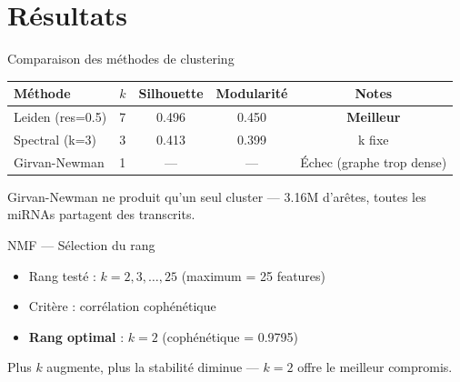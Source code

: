 \section{Résultats}

\begin{frame}{Comparaison des méthodes de clustering}
\begin{table}
\centering
\small
\begin{tabular}{@{} lcccc @{}}
  \toprule
  \textbf{Méthode} & \textbf{$k$} & \textbf{Silhouette} & \textbf{Modularité} & \textbf{Notes} \\
  \midrule
  Leiden (res=0.5) & 7 & 0.496 & 0.450 & \textbf{Meilleur} \\
  Spectral (k=3) & 3 & 0.413 & 0.399 & k fixe \\
  Girvan-Newman & 1 & — & — & Échec (graphe trop dense) \\
  \bottomrule
\end{tabular}
\end{table}

\vspace{0.5em}
Girvan-Newman ne produit qu'un seul cluster — 3.16M d'arêtes, toutes les miRNAs partagent des transcrits.
\end{frame}

\begin{frame}{NMF — Sélection du rang}
\begin{itemize}
  \item Rang testé : $k = 2, 3, \dots, 25$ (maximum = 25 features)
  \item Critère : corrélation cophénétique
  \item \textbf{Rang optimal} : $k = 2$ (cophénétique = 0.9795)
\end{itemize}

\vspace{0.5em}
\vspace{0.5em}
Plus $k$ augmente, plus la stabilité diminue — $k=2$ offre le meilleur compromis.
\end{frame}

